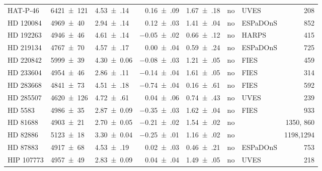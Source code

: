 \documentclass[fleqn]{fcup-thesis}
\newcommand{\object}[1]{#1}
\begin{document}
\begin{landscape}
\begin{ThreePartTable}
\begin{longtable}{lllrlclr}
        \object{HAT-P-46}       &   \num{6421(121)}   &  \num{4.53(14)}\tnote{a}    &  \num{ 0.16(09)}  &  \num{1.67(18)}  & no   &  UVES             &  208  \\[5pt]
        \object{HD 120084}      &   \num{4969(40)}    &  \num{2.94(14)}\tnote{a}    &  \num{ 0.12(03)}  &  \num{1.41(04)}  & no   &  ESPaDOnS         &  852  \\
        \object{HD 192263}      &   \num{4946(46)}    &  \num{4.61(14)}             &  \num{-0.05(02)}  &  \num{0.66(12)}  & no   &  HARPS            &  415  \\
        \object{HD 219134}      &   \num{4767(70)}    &  \num{4.57(17)}             &  \num{ 0.00(04)}  &  \num{0.59(24)}  & no   &  ESPaDOnS         &  725  \\
        \object{HD 220842}      &   \num{5999(39)}    &  \num{4.30(6)}\tnote{a}     &  \num{-0.08(03)}  &  \num{1.21(05)}  & no   &  FIES             &  459  \\
        \object{HD 233604}      &   \num{4954(46)}    &  \num{2.86(11)}\tnote{a}    &  \num{-0.14(04)}  &  \num{1.61(05)}  & no   &  FIES             &  314  \\
        \object{HD 283668}      &   \num{4841(73)}    &  \num{4.51(18)}             &  \num{-0.74(04)}  &  \num{0.16(61)}  & no   &  FIES             &  592  \\
        \object{HD 285507}      &   \num{4620(126)}   &  \num{4.72(61)}             &  \num{ 0.04(06)}  &  \num{0.74(43)}  & no   &  UVES             &  239  \\
        \object{HD 5583}        &   \num{4986(35)}    &  \num{2.87(9)}\tnote{a}     &  \num{-0.35(03)}  &  \num{1.62(04)}  & no   &  FIES             &  933  \\
        \object{HD 81688}       &   \num{4903(21)}    &  \num{2.70(5)}\tnote{a}     &  \num{-0.21(02)}  &  \num{1.54(02)}  & no   & \tnote{b}         & 1350, 860  \\
        \object{HD 82886}       &   \num{5123(18)}    &  \num{3.30(4)}\tnote{a}     &  \num{-0.25(01)}  &  \num{1.16(02)}  & no   & \tnote{c}         & 1198,1294  \\[5pt]
        \object{HD 87883}       &   \num{4917(68)}    &  \num{4.53(19)}             &  \num{ 0.02(03)}  &  \num{0.46(21)}  & no   &  ESPaDOnS         &  753  \\
        \object{HIP 107773}     &   \num{4957(49)}    &  \num{2.83(9)}\tnote{a}     &  \num{ 0.04(04)}  &  \num{1.49(05)}  & no   &  UVES             &  218  \\

\end{longtable}
\end{ThreePartTable}
\end{landscape}
\end{document}
